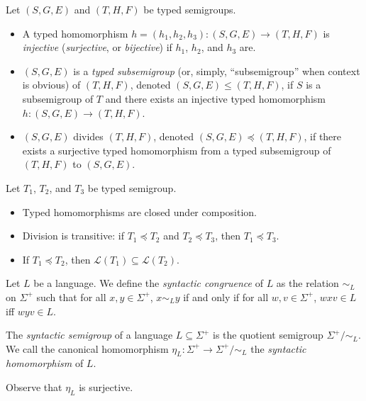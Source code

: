 \documentclass[a4paper,UKenglish,cleveref, autoref, thm-restate, anonymous]{lipics-v2021}
\begin{document}
\begin{definition}
    Let $(S, G, E)$ and $(T, H, F)$ be typed semigroups.
    \begin{itemize}
        \item A typed homomorphism $h = (h_1, h_2, h_3) : (S, G, E) \rightarrow (T, H, F)$ is \emph{injective} (\emph{surjective}, or \emph{bijective}) if $h_1$, $h_2$, and $h_3$ are.
        \item $(S, G, E)$ is a \emph{typed subsemigroup} (or, simply, ``subsemigroup'' when context is obvious) of $(T, H, F)$, denoted $(S, G, E) \leq (T, H, F)$, if $S$ is a subsemigroup of $T$ and there exists an injective typed homomorphism $h : (S, G, E) \rightarrow (T, H, F)$.
        \item $(S, G, E)$ divides $(T, H, F)$, denoted $(S, G, E) \preceq (T, H, F)$, if there exists a surjective  typed homomorphism from a typed subsemigroup of $(T, H, F)$ to $(S, G, E)$.
        \iffalse TODO: remove before submission
            \item A  typed semigroup $(S, G', E)$ is a \emph{shift} of $(S, G, E)$ if there exist $p,q \in S$, with \[G' = \{\{s \in S \mid psq \in A\} \mid A \in G\}.\]
            \item Let $E' \subseteq S$ be any finite set. Then, we call $(S, G, E')$ a \emph{unit relaxation} of $(S, G, E)$.
        \fi
    \end{itemize}
\end{definition}

\begin{proposition}\label{prop:typedsemigroupprops}
    Let $T_1$, $T_2$, and $T_3$ be typed semigroup.
    \begin{itemize}
        \item Typed homomorphisms are closed under composition.
        \item Division is transitive: if $T_1 \preceq T_2$ and $T_2 \preceq T_3$, then $T_1 \preceq T_3$.
        \item If $T_1 \preceq T_2$, then $\mathcal{L}(T_1) \subseteq \mathcal{L}(T_2)$.
    \end{itemize}
\end{proposition}

\begin{definition}\label{def:syncong}
    Let $L$ be a language. We define the \emph{syntactic congruence} of $L$ as the relation $\sim_L$ on $\Sigma^+$ such that for all $x, y \in \Sigma^+$, $x \sim_L y$ if and only if for all $w,v \in \Sigma^+$, $wxv \in L$ iff $wyv \in L$.
\end{definition}
\begin{definition}
    The \emph{syntactic semigroup} of a language $L \subseteq \Sigma^+$ is the quotient semigroup $\Sigma^+/{\sim_L}$. We call the canonical homomorphism $\eta_L : \Sigma^+ \to \Sigma^+/{\sim_L}$ the \emph{syntactic homomorphism} of $L$.
\end{definition}
\begin{remark}
    Observe that $\eta_L$ is surjective.
\end{remark}
\end{document}
